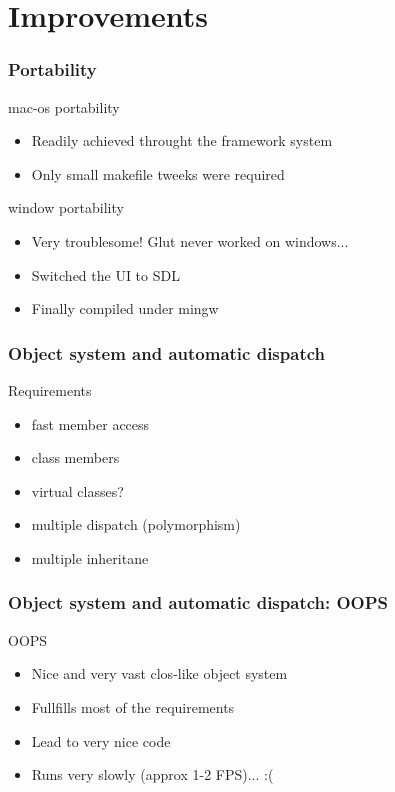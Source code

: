 \documentclass{beamer}
\newcommand{\<}[1]{\`#1}
\begin{document}


\section{Improvements}

\begin{frame}
  \frametitle{Portability}
  \begin{block}{mac-os portability}
    \begin{itemize}
    \item Readily achieved throught the framework system
    \item Only small makefile tweeks were required
    \end{itemize}
  \end{block}

  \begin{block}{window portability}
    \begin{itemize}
    \item Very troublesome! Glut never worked on windows...
    \item Switched the UI to SDL
    \item Finally compiled under mingw
    \end{itemize}
  \end{block}
\end{frame}

\begin{frame}
  \frametitle{Object system and automatic dispatch}

  \begin{block}{Requirements}
    \begin{itemize}
    \item fast member access
    \item class members
    \item virtual classes?
    \item multiple dispatch (polymorphism)
    \item multiple inheritane
    \end{itemize}
  \end{block}

\end{frame}

\begin{frame}
  \frametitle{Object system and automatic dispatch: OOPS}

  \begin{block}{OOPS}
    \begin{itemize}
    \item Nice and very vast clos-like object system
    \item Fullfills most of the requirements
    \item Lead to very nice code
    \item Runs very \alert{slowly} (approx 1-2 FPS)... :(
    \end{itemize}
  \end{block}

\end{frame}
\end{document}
